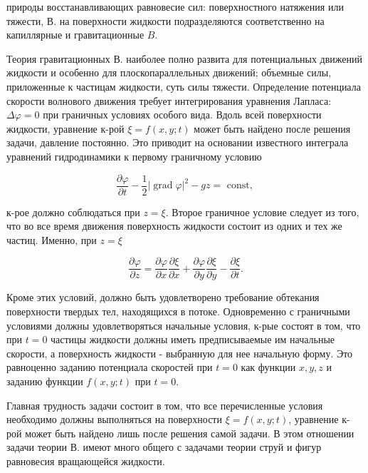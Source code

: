 \documentclass[10pt]{article}
\begin{document}
природы восстанавливающих равновесие сил: поверхностного натяжения или тяжести, В. на поверхности жидкости подразделяются соответственно на капиллярные и гравитационные $B$.



Теория гравитационных В. наиболее полно развита для потенциальных движений жидкости и особенно для плоскопараллельных движений; объемные силы, приложенные к частицам жидкости, суть силы тяжести. Определение потенциала скорости волнового движения требует интегрирования уравнения Лапласа: $\Delta \varphi=0$ при граничных условиях особого вида. Вдоль всей поверхности жидкости, уравнение к-рой $\xi=f(x, y ; t)$ может быть найдено после решения задачи, давление постоянно. Это приводит на основании известного интеграла уравнений гидродинамики к первому граничному условию



\[

\frac{\partial \varphi}{\partial t}-\frac{1}{2}|\operatorname{grad} \varphi|^{2}-g z=\text { const, }

\]



к-рое должно соблюдаться при $z=\xi$. Второе граничное условие следует из того, что во все время движения поверхность жидкости состоит из одних и тех же частиц. Именно, при $z=\xi$



\[

\frac{\partial \varphi}{\partial z}=\frac{\partial \varphi}{\partial x} \frac{\partial \xi}{\partial x}+\frac{\partial \varphi}{\partial y} \frac{\partial \xi}{\partial y}-\frac{\partial \xi}{\partial t} .

\]



Кроме этих условий, должно быть удовлетворено требование обтекания поверхности твердых тел, находящихся в потоке. Одновременно с граничными условиями должны удовлетворяться начальные условия, к-рые состоят в том, что при $t=0$ частицы жидкости должны иметь предписываемые им начальные скорости, а поверхность жидкости - выбранную для нее начальную форму. Это равноценно заданию потенциала скоростей при $t=0$ как функции $x, y, z$ и заданию функции $f(x, y ; t)$ при $t=0$.



Главная трудность задачи состоит в том, что все перечисленные условия необходимо должны выполняться на поверхности $\xi=f(x, y ; t)$, уравнение к-рой может быть найдено лишь после решения самой задачи. В этом отношении задачи теории В. имеют много общего с задачами теории струй и фигур равновесия вращающейся жидкости.
\end{document}

